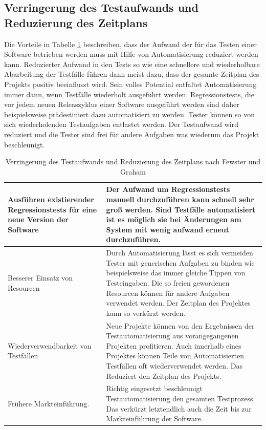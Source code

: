 \subsection{Verringerung des Testaufwands und Reduzierung des Zeitplans}
\label{sec:verringerung_des_testaufwands_und_reduzierung_des_zeitplans}
Die Vorteile in Tabelle \ref{tbl:effizienz_testautomatisierung} beschreiben, dass der Aufwand der für das Testen einer Software betrieben werden muss mit Hilfe von Automatisierung reduziert werden kann.
Reduzierter Aufwand in den Tests so wie eine schnellere und wiederholbare Abarbeitung der Testfälle führen dann meist dazu, dass der gesamte Zeitplan des Projekts positiv beeinflusst wird. Sein volles Potential entfaltet Automatisierung immer dann, wenn Testfälle wiederholt ausgeführt werden. Regressionstests, die vor jedem neuen Releaszyklus einer Software ausgeführt werden sind daher beispielsweise prädestiniert dazu automatisiert zu werden. Tester können so von sich wiederholenden Testaufgaben entlastet werden. Der Testaufwand wird reduziert und die Tester sind frei für andere Aufgaben was wiederum das Projekt beschleunigt.

\begin{table}
\begin{tabular}{p{}|p{}}
Ausführen existierender Regressionstests für eine neue Version der Software
& Der Aufwand um Regressionstests manuell durchzuführen kann schnell sehr groß werden. Sind Testfälle automatisiert ist es möglich sie bei Änderungen am System mit wenig aufwand erneut durchzuführen. \\
\hline 
Besserer Einsatz von Resourcen
& Durch Automatisierung lässt es sich vermeiden Tester mit generischen Aufgaben zu binden wie beispielsweise das immer gleiche Tippen von Testeingaben.
Die so freien gewordenen Resourcen können für andere Aufgaben verwendet werden.
Der Zeitplan des Projektes kann so verkürzt werden. \\ 
\hline 
Wiederverwendbarkeit von Testfällen & 
Neue Projekte können von den Ergebnissen der Testautomatisierung aus vorangegangenen Projekten profitieren. Auch innerhalb eines Projektes können Teile von Automatisierten Testfällen oft wiederverwendet werden.
Das Reduziert den Zeitplan des Projekts. \\ 
\hline 
Frühere Markteinführung. & Richtig eingesetzt beschleunigt Testautomatisierung den gesamten Testprozess. Das verkürzt letztendlich auch die Zeit bis zur Markteinführung der Software. \\ 


\end{tabular} 
\caption{Verringerung des Testaufwands und Reduzierung des Zeitplans nach Fewster und Graham \cite[vgl. S. 9 ff.]{fewster_software_1999}}
\label{tbl:effizienz_testautomatisierung}
\end{table}

